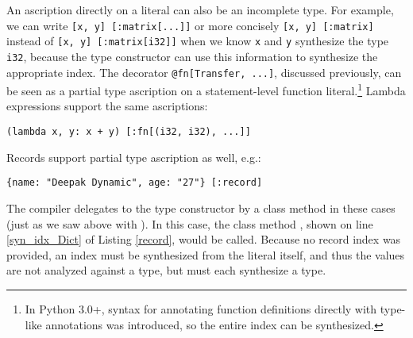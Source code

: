 An ascription directly on a literal can also be an incomplete type. For example, we can write \lstinline[basicstyle=\ttfamily\small]{[x, y] [:matrix[...]]} or more concisely \lstinline[basicstyle=\ttfamily\small]{[x, y] [:matrix]} instead of \lstinline[basicstyle=\ttfamily\small]{[x, y] [:matrix[i32]]} when we know \lstinline[basicstyle=\ttfamily\small]{x} and \lstinline[basicstyle=\ttfamily\small]{y} synthesize the type \lstinline[basicstyle=\ttfamily\small]{i32}, because the type constructor can use this information to synthesize the appropriate index. The decorator \lstinline[basicstyle=\ttfamily\small]{@fn[Transfer, ...]}, discussed previously, can be seen as a partial type ascription on a statement-level function literal.\footnote{In Python 3.0+, syntax for annotating function definitions directly with type-like annotations was introduced, so the entire index can be synthesized.} Lambda expressions support the same ascriptions:
\vspace{3px}
\begin{lstlisting}[numbers=none, basicstyle=\ttfamily\scriptsize]
(lambda x, y: x + y) [:fn[(i32, i32), ...]]
\end{lstlisting}
\noindent
Records support partial type ascription as well, e.g.: 
\vspace{3px}
\begin{lstlisting}[numbers=none,basicstyle=\ttfamily\scriptsize]
{name: "Deepak Dynamic", age: "27"} [:record]
\end{lstlisting}
\noindent
The compiler delegates to the type constructor by a class method in these cases (just as we saw above with ). In this case, the class method , shown on line \ref{syn_idx_Dict} of Listing \ref{record}, would be called. Because no record index was provided, an index must be synthesized from the literal itself, and thus the values are not analyzed against a type, but must each synthesize a type.

